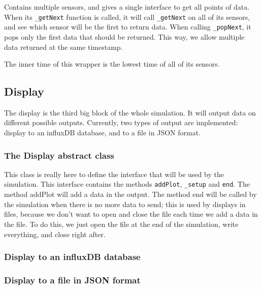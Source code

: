 Contains multiple sensors, and gives a single interface to get all
points of data.  When its \verb!_getNext! function is called, it will call
\verb!_getNext! on all of its sensors, and see which sensor will be the first
to return data. When calling \verb!_popNext!, it pops only the first data
that should be returned. This way, we allow multiple data returned at the same
timestamp.

The inner time of this wrapper is the lowest time of all of its sensors.

\subsection{Display}

The display is the third big block of the whole simulation. It will output data
on different possible outputs. Currently, two types of output are implemented:
display to an influxDB database, and to a file in JSON format.

\subsubsection{The Display abstract class}

This class is really here to define the interface that will be used
by the simulation. This interface contains the methods \verb!addPlot!,
\verb!_setup! and \verb!end!. The method addPlot will add a data in the
output. The method end will be called by the simulation when there is no more
data to send; this is used by displays in files, because we don't want to open
and close the file each time we add a data in the file. To do this, we just
open the file at the end of the simulation, write everything, and close right
after.

\subsubsection{Display to an influxDB database}

\subsubsection{Display to a file in JSON format}
